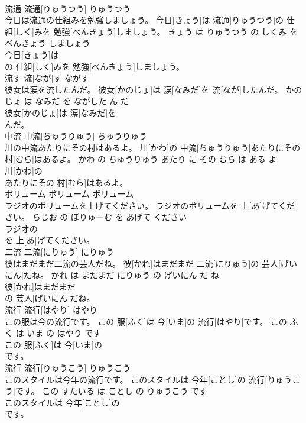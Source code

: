 \documentclass[8pt]{extreport}
\begin{document}
\begin{CJK}{UTF8}{min}
\\	流通	流通[りゅうつう]	りゅうつう	
\\	今日は流通の仕組みを勉強しましょう。	今日[きょう]は 流通[りゅうつう]の 仕組[しく]みを 勉強[べんきょう]しましょう。	きょう は りゅうつう の しくみ を べんきょう しましょう	
\\	今日[きょう]は
\\	の 仕組[しく]みを 勉強[べんきょう]しましょう。			
\\	流す	流[なが]す	ながす	
\\	彼女は涙を流したんだ。	彼女[かのじょ]は 涙[なみだ]を 流[なが]したんだ。	かのじょ は なみだ を ながした ん だ	
\\	彼女[かのじょ]は 涙[なみだ]を
\\	んだ。			
\\	中流	中流[ちゅうりゅう]	ちゅうりゅう	
\\	川の中流あたりにその村はあるよ。	川[かわ]の 中流[ちゅうりゅう]あたりにその 村[むら]はあるよ。	かわ の ちゅうりゅう あたり に その むら は ある よ	
\\	川[かわ]の
\\	あたりにその 村[むら]はあるよ。			
\\	ボリューム	ボリューム	ボリューム	
\\	ラジオのボリュームを上げてください。	ラジオのボリュームを 上[あ]げてください。	らじお の ぼりゅーむ を あげて ください	
\\	ラジオの
\\	を 上[あ]げてください。			
\\	二流	二流[にりゅう]	にりゅう	
\\	彼はまだまだ二流の芸人だね。	彼[かれ]はまだまだ 二流[にりゅう]の 芸人[げいにん]だね。	かれ は まだまだ にりゅう の げいにん だ ね	
\\	彼[かれ]はまだまだ
\\	の 芸人[げいにん]だね。			
\\	流行	流行[はやり]	はやり	
\\	この服は今の流行です。	この 服[ふく]は 今[いま]の 流行[はやり]です。	この ふく は いま の はやり です	
\\	この 服[ふく]は 今[いま]の
\\	です。			
\\	流行	流行[りゅうこう]	りゅうこう	
\\	このスタイルは今年の流行です。	このスタイルは 今年[ことし]の 流行[りゅうこう]です。	この すたいる は ことし の りゅうこう です	
\\	このスタイルは 今年[ことし]の
\\	です。			

\end{CJK}
\end{document}
